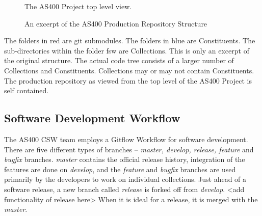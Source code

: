 \documentclass[12pt, a4paper, titlepage]{scrartcl}
\newcommand{\courierword}[1]{\textsf{\itshape #1}}{\fontfamily{pcr}\selectfont}%
\begin{document}
\begin{figure}[h]
\caption{The AS400 Project top level view.}
\label{fig:as400-top-level}
\noindent{}
\end{figure}
\begin{figure}
\caption{An excerpt of the AS400 Production Repository Structure}
\label{fig:prod-repo-structure}
\noindent{}
\end{figure}
\par The folders in red are git submodules. The folders in blue are Constituents. The sub-directories within the folder fsw are Collections. This is only an excerpt of the original structure. The actual code tree consists of a larger number of Collections and Constituents. Collections may or may not contain Constituents. The production repository as viewed from the top level of the AS400 Project is self contained. 
\subsection{Software Development Workflow}
The AS400 CSW team employs a Gitflow Workflow\cite{GitflowWorkflow} for software development. There are five different types of branches – \courierword{master, develop, release, feature} and \courierword{bugfix} branches. \courierword{master} contains the official release history, integration of the features are done on \courierword{develop}, and the \courierword{feature} and \courierword{bugfix} branches are used primarily by the developers to work on individual collections. Just ahead of a software release, a new branch called \courierword{release} is forked off from \courierword{develop}. <add functionality of release here> When it is ideal for a release, it is merged with the \courierword{master}.   
\end{document}
